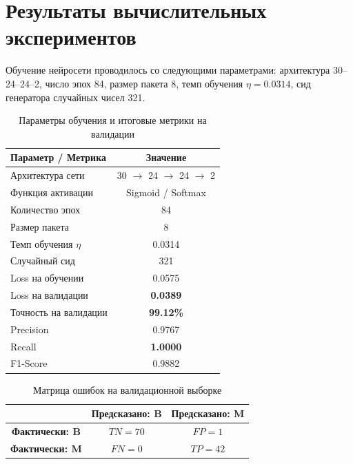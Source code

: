 \documentclass[a4paper,14pt]{extarticle}
\begin{document}
\section{Результаты вычислительных экспериментов}

Обучение нейросети проводилось со следующими параметрами: архитектура 30--24--24--2, число эпох 84, размер пакета 8, темп обучения $\eta = 0.0314$, сид генератора случайных чисел 321.

\begin{table}[H]
\centering
\caption{Параметры обучения и итоговые метрики на валидации}
\vspace{0.2cm}
\begin{tabular}{|l|c|}
\hline
\textbf{Параметр / Метрика} & \textbf{Значение} \\ \hline
Архитектура сети & 30 $\to$ 24 $\to$ 24 $\to$ 2 \\ \hline
Функция активации & Sigmoid / Softmax \\ \hline
Количество эпох & 84 \\ \hline
Размер пакета & 8 \\ \hline
Темп обучения $\eta$ & 0.0314 \\ \hline
Случайный сид & 321 \\ \hline
Loss на обучении & 0.0575 \\ \hline
Loss на валидации & \textbf{0.0389} \\ \hline
Точность на валидации & \textbf{99.12\%} \\ \hline
Precision & 0.9767 \\ \hline
Recall & \textbf{1.0000} \\ \hline
F1-Score & 0.9882 \\ \hline
\end{tabular}
\end{table}

\begin{table}[H]
\centering
\caption{Матрица ошибок на валидационной выборке}
\vspace{0.2cm}
\begin{tabular}{|c|c|c|}
\hline
 & \textbf{Предсказано: B} & \textbf{Предсказано: M} \\ \hline
\textbf{Фактически: B} & $TN = 70$ & $FP = 1$ \\ \hline
\textbf{Фактически: M} & $FN = 0$ & $TP = 42$ \\ \hline
\end{tabular}
\end{table}
\end{document}
